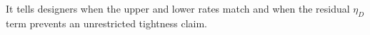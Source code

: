 It tells designers when the upper and lower rates match and when the residual \(\eta_D\) term prevents an unrestricted tightness claim.